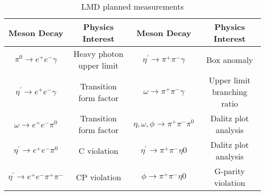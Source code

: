 \begin{table}[h!]
\begin{minipage}{\textwidth}
\begin{center}


\caption{\label{tab:lmd.channels}LMD planned measurements \vspace{0.75mm}}
\begin{tabular}{cc||cc}
\hline
Meson Decay & Physics Interest &Meson Decay & Physics Interest \\
\hline
$\pi^0\to e^+e^-\gamma$  & Heavy photon upper limit &$\eta^{\prime}\to \pi^+\pi^-\gamma$  & Box anomaly \\
$\eta^{\prime}\to e^+e^-\gamma$  & Transition form factor &$\omega\to \pi^+\pi^-\gamma$  & Upper limit branching ratio \\
$\omega\to e^+e^-\pi^0$ & Transition form factor & $\eta, \omega, \phi\to \pi^+\pi^-\pi^0$ & Dalitz plot analysis\\
$\eta^{\prime}\to e^+e^-\pi^0$ & C violation & $\eta^{\prime}\to \pi^+\pi^-\eta0$ & Dalitz plot analysis\\
$\eta^{\prime}\to e^+e^-\pi^+\pi^-$  & CP violation & $\phi\to \pi^+\pi^-\eta0$ & G-parity violation\\
\hline 
\end{tabular}


\end{center}
\end{minipage}
\end{table}
\vspace{20pt}